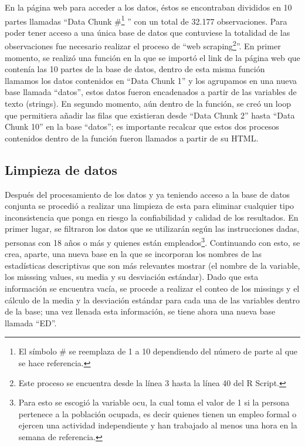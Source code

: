 \documentclass[12pt]{article}
\begin{document}
En la página web para acceder a los datos, éstos se encontraban divididos en 10 partes llamadas “Data Chunk \#\footnote{El símbolo # se reemplaza de 1 a 10 dependiendo del número de parte al que se hace referencia.} ” con un total de 32.177 observaciones. Para poder tener acceso a una única base de datos que contuviese la totalidad de las observaciones fue necesario realizar el proceso de “web scraping\footnote{Este proceso se encuentra desde la línea 3 hasta la línea 40 del R Script.}”. En primer momento, se realizó una función en la que se importó el link de la página web que contenía las 10 partes de la base de datos, dentro de esta misma función llamamos los datos contenidos en “Data Chunk 1” y los agrupamos en una nueva base llamada “datos”, estos datos fueron encadenados a partir de las variables de texto (strings). En segundo momento, aún dentro de la función, se creó un loop que permitiera añadir las filas que existieran desde “Data Chunk 2” hasta “Data Chunk 10” en la base “datos”; es importante recalcar que estos dos procesos contenidos dentro de la función fueron llamados a partir de su HTML.

\subsection{Limpieza de datos}

Después del procesamiento de los datos y ya teniendo acceso a la base de datos conjunta se procedió a realizar una limpieza de esta para eliminar cualquier tipo inconsistencia que ponga en riesgo la confiabilidad y calidad de los resultados. En primer lugar, se filtraron los datos que se utilizarán según las instrucciones dadas, personas con 18 años o más y quienes están empleados\footnote{Para esto se escogió la variable ocu, la cual toma el valor de 1 si la persona pertenece a la población ocupada, es decir quienes tienen un empleo formal o ejercen una actividad independiente y han trabajado al menos una hora en la semana de referencia.}. Continuando con esto, se crea, aparte, una nueva base en la que se incorporan los nombres de las estadísticas descriptivas que son más relevantes mostrar (el nombre de la variable, los misssing values, su media y su desviación estándar). Dado que esta información se encuentra vacía, se procede a realizar el conteo de los missings y el cálculo de la media y la desviación estándar para cada una de las variables dentro de la base; una vez llenada esta información, se tiene ahora una nueva base llamada “ED”.  \\
\end{document}
